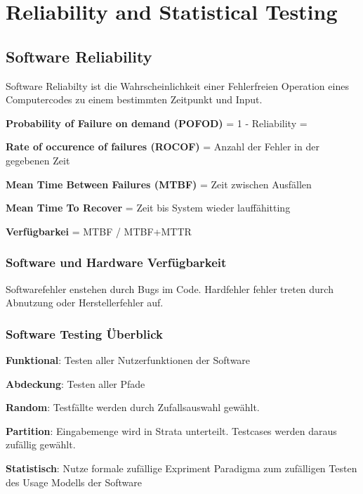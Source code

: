 \chapter{Reliability and Statistical Testing}
\section{Software Reliability}

Software Reliabilty ist die Wahrscheinlichkeit einer Fehlerfreien Operation
eines Computercodes zu einem bestimmten Zeitpunkt und Input.

\begin{compactitem}
    \item \textbf{Probability of Failure on demand (POFOD)} = 1 - Reliability =
    \item \textbf{Rate of occurence of failures (ROCOF)} = Anzahl der Fehler in der
    gegebenen Zeit
    \item \textbf{Mean Time Between Failures (MTBF)} = Zeit zwischen Ausfällen
    \item \textbf{Mean Time To Recover} = Zeit bis System wieder lauffähitting
    \item \textbf{Verfügbarkei} = MTBF / MTBF+MTTR
\end{compactitem}

\subsection{Software und Hardware Verfügbarkeit}

Softwarefehler enstehen durch Bugs im Code.
Hardfehler fehler treten durch Abnutzung oder Herstellerfehler auf.

\subsection{Software Testing Überblick}
\begin{compactitem}
    \item \textbf{Funktional}: Testen aller Nutzerfunktionen der Software
    \item \textbf{Abdeckung}: Testen aller Pfade
    \item \textbf{Random}: Testfällte werden durch Zufallsauswahl gewählt.
    \item \textbf{Partition}: Eingabemenge wird in Strata unterteilt. Testcases werden daraus zufällig
    gewählt.
    \item \textbf{Statistisch}: Nutze formale zufällige Expriment Paradigma zum zufälligen Testen
    des Usage Modells der Software
\end{compactitem}

